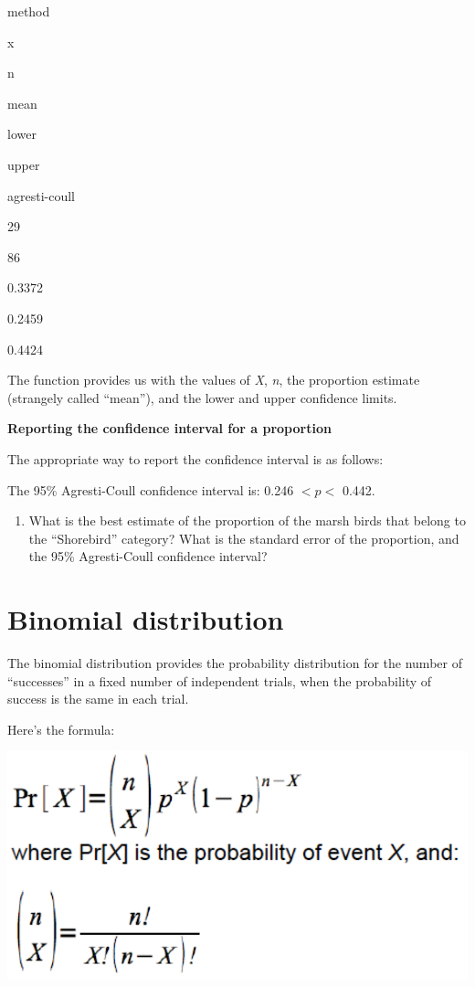 \documentclass[
]{book}
\providecommand{\tightlist}{%
  \setlength{\itemsep}{0pt}\setlength{\parskip}{0pt}}
\begin{document}
method

x

n

mean

lower

upper

agresti-coull

29

86

0.3372

0.2459

0.4424

The function provides us with the values of \emph{X}, \emph{n}, the proportion estimate (strangely called ``mean''), and the lower and upper confidence limits.

\textbf{Reporting the confidence interval for a proportion}

The appropriate way to report the confidence interval is as follows:

The 95\% Agresti-Coull confidence interval is: 0.246 \(< {p} <\) 0.442.

\begin{enumerate}
\def\labelenumi{\arabic{enumi}.}
\tightlist
\item
  What is the best estimate of the proportion of the marsh birds that belong to the ``Shorebird'' category? What is the standard error of the proportion, and the 95\% Agresti-Coull confidence interval?
\end{enumerate}

\section{Binomial distribution}\label{binomdist}

The binomial distribution provides the probability distribution for the number of ``successes'' in a fixed number of independent trials, when the probability of success is the same in each trial.

Here's the formula:

\includegraphics[width=12.5in]{./more/binomial_equation}
\end{document}
